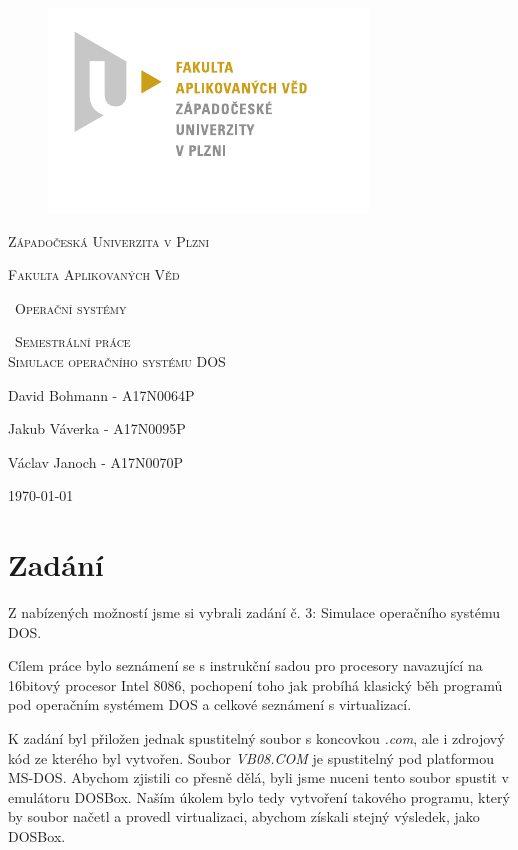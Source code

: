 \documentclass[a4paper, 12pt]{article}
\begin{document}
\begin{titlepage}

	\centering
	\begin{figure}
    \centering
	\includegraphics[scale=2]{img/logo.pdf}\par\vspace{1cm}
	\end{figure}
	{\scshape\huge Západočeská Univerzita v Plzni \par}
	\vspace{0.5cm}
	{\scshape\LARGE Fakulta Aplikovaných Věd\par}
	\vspace{1.5cm}
	{\scshape\Large\ Operační systémy\par}
	\vspace{0.5cm}
	{\scshape\Large\ Semestrální práce \\ Simulace operačního systému DOS \par}
	\vspace{1cm}
	{\Large David Bohmann - A17N0064P\par}
	{\Large Jakub Váverka - A17N0095P\par}
	{\Large Václav Janoch - A17N0070P\par}
	\vfill
	{\large \today\par}
\end{titlepage}
\tableofcontents

\newpage
{}
\section{Zadání}
\par Z nabízených možností jsme si vybrali zadání č. 3: Simulace operačního systému DOS.
\par Cílem práce bylo seznámení se s instrukční sadou pro procesory navazující na 16bitový procesor Intel 8086, pochopení toho jak probíhá klasický běh programů pod operačním systémem DOS a celkové seznámení s virtualizací.
\par K zadání byl přiložen jednak spustitelný soubor s koncovkou \textit{.com}, ale i zdrojový kód ze kterého byl vytvořen. Soubor \textit{VB08.COM} je spustitelný pod platformou MS-DOS. Abychom zjistili co přesně dělá, byli jsme nuceni tento soubor spustit v emulátoru DOSBox. Naším úkolem bylo tedy vytvoření takového programu, který by soubor načetl a provedl virtualizaci, abychom získali stejný výsledek, jako DOSBox.  
\end{document}
